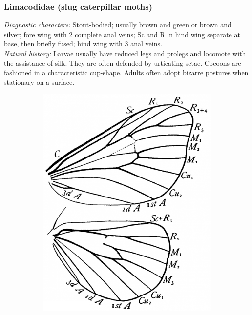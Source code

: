 \documentclass[letterpaper, 11pt]{article}
\begin{document}
\subsubsection{Limacodidae (slug caterpillar moths)}
\noindent{}\textit{Diagnostic characters:} Stout-bodied; usually brown and green or brown and silver; fore wing with 2 complete anal veins; Sc and R in hind wing separate at base, then briefly fused; hind wing with 3 anal veins.\\

\noindent{}\textit{Natural history:} Larvae usually have reduced legs and prolegs and locomote with the assistance of silk. They are often defended by urticating setae. Cocoons are fashioned in a characteristic cup-shape. Adults often adopt bizarre postures when stationary on a surface.

\begin{figure}[ht!]
    \centering
    \begin{subfigure}[ht!]{0.3\textwidth}
        \includegraphics[width=\textwidth]{LimacodidWings}

\end{subfigure}
\end{figure}
\end{document}
